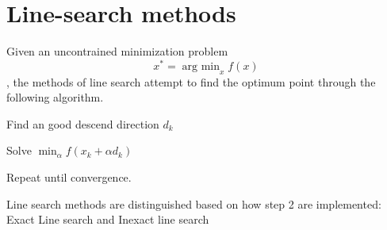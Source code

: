 \section{Line-search methods}
\begin{slide}
Given an uncontrained minimization problem $$x^* = \operatorname{arg\ min}_x f(x)$$, the methods of line search attempt to find the optimum point through the following algorithm.
\begin{description}
	\item[Step 1] Find an good descend direction $d_k$
	\item[Step 2] Solve $\min_\alpha f(x_k +\alpha d_k)$
	\item Repeat until convergence.
\end{description}
Line search methods are distinguished  based on how step 2 are implemented: Exact Line search and Inexact line search
\end{slide}

